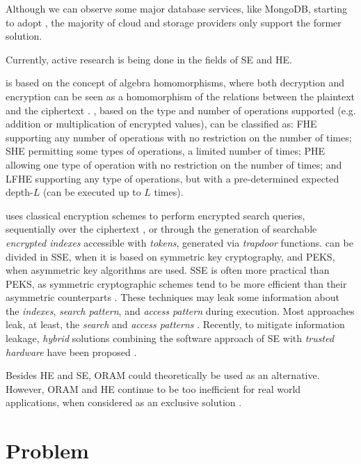 Although we can observe some major database services, like MongoDB, starting to adopt  \autocite{noauthor_undated-ds}, the majority of cloud and storage providers only support the former solution.

Currently, active research is being done in the fields of \gls{SE} and \gls{HE}.

 is based on the concept of algebra homomorphisms, where both decryption and encryption can be seen as a homomorphism of the relations between the plaintext and the ciphertext \autocite{Acar2018-mp, Fontaine2007-sv}. , based on the type and number of operations supported (e.g. addition or multiplication of encrypted values), can be classified as: \gls{FHE} supporting any number of operations with no restriction on the number of times; \gls{SHE} permitting some types of operations, a limited number of times; \gls{PHE} allowing one type of operation with no restriction on the number of times; and \gls{LFHE} \autocite{Brakerski2014-nm} supporting any type of operations, but with a pre-determined expected depth-$L$ (can be executed up to $L$ times).

 uses classical encryption schemes to perform encrypted search queries, sequentially over the ciphertext \autocite{Song2000-hu}, or through the generation of searchable \emph{encrypted indexes} accessible with \emph{tokens}, generated via \emph{trapdoor} functions.  can be divided in \gls{SSE}, when it is based on symmetric key cryptography, and \gls{PEKS}, when asymmetric key algorithms are used. \gls{SSE} is often more practical than \gls{PEKS}, as symmetric cryptographic schemes tend to be more efficient than their asymmetric counterparts \autocite{Pearson2017-ve}. These techniques may leak some information about the \emph{indexes}, \emph{search pattern}, and \emph{access pattern} during execution. Most approaches leak, at least, the \emph{search} and \emph{access patterns} \autocite{Bosch2014-eb}. Recently, to mitigate information leakage, \emph{hybrid} solutions combining the software approach of \gls{SE} with \emph{trusted hardware} have been proposed \autocite{Ferreira2020-ze}.

Besides \gls{HE} and \gls{SE}, \gls{ORAM} \autocite{Goldreich1996-yb} could theoretically be used as an alternative. However, \gls{ORAM} and \gls{HE} continue to be too inefficient for real world applications, when considered as an exclusive solution \autocite{Bosch2014-eb}.

\section{Problem}
\label{ch1:sec:problem}

